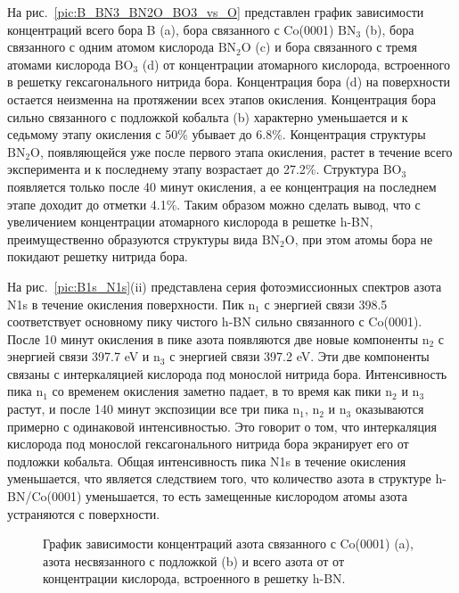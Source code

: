На рис.~\ref{pic:B_BN3_BN2O_BO3_vs_O} представлен график зависимости концентраций всего бора B (a), бора связанного с Co(0001)
$\mathrm{BN_3}$ (b), бора связанного с одним атомом кислорода $\mathrm{BN_2O}$ (c) и бора связанного с тремя атомами кислорода
$\mathrm{BO_3}$ (d) от концентрации атомарного кислорода, встроенного в решетку гексагонального нитрида бора. Концентрация бора (d) на поверхности
остается неизменна на протяжении всех этапов окисления. Концентрация бора сильно связанного с подложкой кобальта (b) характерно 
уменьшается и к седьмому этапу окисления с 50\% убывает до 6.8\%. Концентрация структуры $\mathrm{BN_2O}$, появляющейся уже после
первого этапа окисления, растет в течение всего эксперимента и к последнему этапу возрастает до 27.2\%. Структура $\mathrm{BO_3}$
появляется только после 40 минут окисления, а ее концентрация на последнем этапе доходит до отметки 4.1\%. Таким образом можно
сделать вывод, что с увеличением концентрации атомарного кислорода в решетке h-BN, преимущественно образуются структуры вида
$\mathrm{BN_2O}$, при этом атомы бора не покидают решетку нитрида бора.


На рис.~\ref{pic:B1s_N1s}(ii) представлена серия фотоэмиссионных спектров азота N1s в течение окисления поверхности.
Пик $\mathrm{n_1}$ с энергией связи 398.5 соответствует основному пику чистого h-BN сильно связанного с Co(0001).
После 10 минут окисления в пике азота появляются две новые компоненты $\mathrm{n_2}$ с энергией связи 397.7 eV и
$\mathrm{n_3}$ с энергией связи 397.2 eV. Эти две компоненты связаны с интеркаляцией кислорода под монослой нитрида бора.
Интенсивность пика $\mathrm{n_1}$ со временем окисления заметно падает, в то время как пики $\mathrm{n_2}$ и $\mathrm{n_3}$
растут, и после 140 минут экспозиции все три пика $\mathrm{n_1}$, $\mathrm{n_2}$ и $\mathrm{n_3}$ оказываются примерно с
одинаковой интенсивностью. Это говорит о том, что интеркаляция кислорода под монослой гексагонального нитрида бора экранирует
его от подложки кобальта. Общая интенсивность пика N1s в течение окисления уменьшается, что является следствием того, 
что количество азота в структуре h-BN/Co(0001) уменьшается, то есть замещенные кислородом атомы азота устраняются с поверхности.
\begin{figure}[!ht]
\caption{График зависимости концентраций азота связанного с Co(0001) (a), азота несвязанного с подложкой (b) и всего азота от от концентрации кислорода, встроенного в решетку h-BN.}
\label{pic:Nfree_Nco_Ntot_vs_O}
\end{figure}


